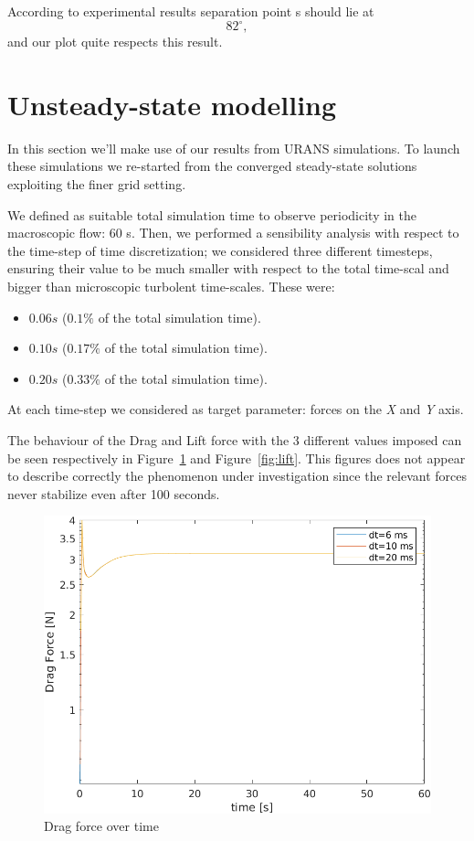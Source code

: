 \documentclass[12pt]{article}
\begin{document}
        According to experimental results separation point s should lie at $$ 82 ^\circ, $$ and our plot quite respects this result.

\section{Unsteady-state modelling} \label{sec:URAN}

        In this section we'll make use of our results from URANS simulations. To launch these simulations we re-started from the converged steady-state solutions exploiting the finer grid setting.

        We defined as suitable total simulation time to observe periodicity in the macroscopic flow: 60 s. Then, we performed a sensibility analysis with respect to the time-step of time discretization; we considered three different timesteps, ensuring their value to be much smaller with respect to the total time-scal and bigger than microscopic turbolent time-scales. These were:

        \begin{itemize}
                \item $0.06 s$ ($0.1\%$ of the total simulation time).
                \item $0.10 s$ ($0.17\%$ of the total simulation time).
                \item $0.20 s$ ($0.33\%$ of the total simulation time).
        \end{itemize}
        
        At each time-step we considered as target parameter: forces on the \textit{X} and \textit{Y} axis.

        The behaviour of the Drag and Lift force with the 3 different values imposed can be seen respectively in Figure~\ref{fig:drag} and Figure~\ref{fig:lift}. This figures does not appear to describe correctly the phenomenon under investigation since the relevant forces never stabilize even after 100 seconds.

        \begin{figure}[!ht]
                \includegraphics[width=\textwidth]{DragForce.png}
                \centering
                \caption{Drag force over time}
                \label{fig:drag}
        \end{figure}
\end{document}
